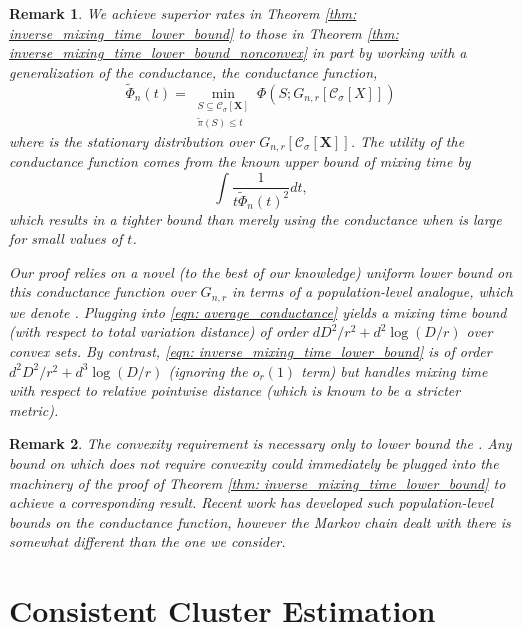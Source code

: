 \documentclass{article}
\newcommand{\1}{\mathbf{1}}
\newcommand{\Xbf}{\mathbf{X}}
\newcommand{\Pbb}{\mathbb{P}}
\newcommand{\Cset}{\mathcal{C}}
\newcommand{\Csig}{\Cset_{\sigma}}
\theoremstyle{aldenthm}
\theoremstyle{aldenrmrk}
\newtheorem{remark}{Remark}
\begin{document}
\begin{remark}
We achieve superior rates in Theorem \ref{thm: inverse_mixing_time_lower_bound}
to those in Theorem \ref{thm: inverse_mixing_time_lower_bound_nonconvex} in part
by working with a generalization of the conductance, the \emph{conductance
  function},
\begin{equation*}
\widetilde{\Phi}_n(t) = 
\min_{\substack{S \subseteq \Csig[\Xbf] \\ \tilde\pi(S) \leq t}} \Phi(S; G_{n,r}[\Csig[X]]) 
\end{equation*}
where \smash{$\tilde\pi$} is the stationary distribution over
$G_{n,r}[\Csig[\Xbf]]$. The utility of the conductance function comes from the
known upper bound of mixing time by  
\begin{equation}
\label{eqn: average_conductance}
\int \frac{1}{t \widetilde{\Phi}_n(t)^2} dt,
\end{equation}
which results in a tighter bound than merely using the conductance when
 is large for small values of $t$. 
 
Our proof relies on a novel (to the best of our knowledge) uniform lower bound
on this conductance function over $G_{n,r}$ in terms of a population-level
analogue, which we denote \smash{$\widetilde{\Phi}_{\Pbb,r}$}. Plugging
\smash{$\widetilde{\Phi}_{\Pbb,r}$} into \eqref{eqn: average_conductance} yields
a mixing time bound (with respect to total variation distance) of order $d
D^2/r^2 + d^2\log(D/r)$ over convex sets. By contrast, \eqref{eqn:
  inverse_mixing_time_lower_bound} is of order $d^2 D^2/r^2 + d^3\log(D/r)$ 
(ignoring the $o_r(1)$ term) but handles mixing time with respect to relative
pointwise distance (which is known to be a stricter metric). 
\end{remark}

\begin{remark}
  The convexity requirement is necessary only to lower bound the
  \smash{$\widetilde{\Phi}_{\Pbb,r}$}. Any bound on
  \smash{$\widetilde{\Phi}_{\Pbb,r}$} which does not require convexity could
  immediately be plugged into the machinery of the proof of Theorem \ref{thm:
    inverse_mixing_time_lower_bound} to achieve a corresponding result. Recent
  work \citep{abbasi17} has developed such population-level bounds on the
  conductance function, however the Markov chain dealt with there is somewhat
  different than the one we consider.   
\end{remark}

\section{Consistent Cluster Estimation}
\label{sec: consistent_cluster_estimation_with_ppr}
\end{document}
